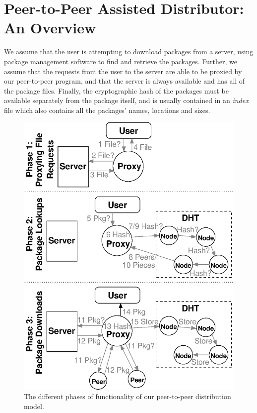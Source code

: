 \documentclass[conference]{IEEEtran}
\begin{document}
\section{Peer-to-Peer Assisted Distributor: An Overview}
\label{opportunity}

We assume that the user is attempting to download packages from a
server, using package management software to find and retrieve the
packages. Further, we assume that the requests from the user to the
server are able to be proxied by our peer-to-peer program, and that
the server is always available and has all of the package files.
Finally, the cryptographic hash of the packages must be available
separately from the package itself, and is usually contained in an
\emph{index} file which also contains all the packages' names,
locations and sizes.

\begin{figure}
\centering
\includegraphics[width=\columnwidth]{model_simple.eps}
\caption{The different phases of functionality of our peer-to-peer distribution model.}
\label{model}
\end{figure}
\end{document}
